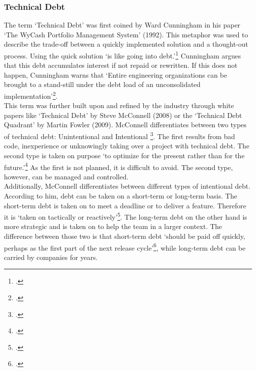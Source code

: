\subsubsection{Technical Debt}
The term `Technical Debt' was first coined by Ward Cunningham in his paper `The WyCash Portfolio Management System' (1992). This metaphor was used to describe the trade-off between a quickly implemented solution and a thought-out process. 
Using the quick solution `is like going into debt.'\footcite[2]{cunninghamWyCashPortfolioManagement1992} Cunningham argues that this debt accumulates interest if not repaid or rewritten. 
If this does not happen, Cunningham warns that `Entire engineering organizations can be brought to a stand-still under the debt load of an unconsolidated implementation'\footcite[2]{cunninghamWyCashPortfolioManagement1992}.\\

This term was further built upon and refined by the industry through white papers like `Technical Debt' by Steve McConnell (2008) or the `Technical Debt Quadrant' by Martin Fowler (2009).
McConnell differentiates between two types of technical debt: Unintentional and Intentional \footcite[3]{mcconnellManagingTechnicalDebt2017}. The first results from bad code, inexperience or unknowingly taking over a project with technical debt.
The second type is taken on purpose `to optimize for the present rather than for the future.'\footcite[3]{mcconnellManagingTechnicalDebt2017} As the first is not planned, it is difficult to avoid. The second type, however, can be managed and controlled.\\
Additionally, McConnell differentiates between different types of intentional debt. According to him, debt can be taken on a short-term or long-term basis. The short-term debt is taken on to meet a deadline or to deliver a feature. Therefore it is `taken on tactically or reactively'\footcite[3]{mcconnellManagingTechnicalDebt2017}.
The long-term debt on the other hand is more strategic and is taken on to help the team in a larger context. The difference between those two is that short-term debt `should be paid off quickly, perhaps as the first part of the next release cycle'\footcite[4]{mcconnellManagingTechnicalDebt2017}, while 
long-term debt can be carried by companies for years.\\


